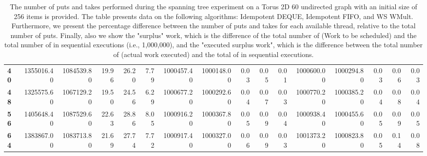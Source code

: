 \begin{table}[!ht]
{\begin{tabular}{lrrrrrrrrrrrrrrr}
\textbf{40} &       1355016.40 & 1084539.80 &          19.96 &       26.20 &                 7.79 &      1000457.40 & 1000148.00 &           0.03 &        0.05 &                 0.01 & 1000600.00 & 1000294.80 &           0.03 &        0.06 &                 0.03 \\
\textbf{48} &       1325575.60 & 1067129.20 &          19.50 &       24.56 &                 6.29 &      1000677.20 & 1000292.60 &           0.04 &        0.07 &                 0.03 & 1000770.20 & 1000385.20 &           0.04 &        0.08 &                 0.04 \\
\textbf{56} &       1405648.40 & 1087529.60 &          22.63 &       28.86 &                 8.05 &      1000916.20 & 1000367.80 &           0.05 &        0.09 &                 0.04 & 1000938.40 & 1000455.60 &           0.05 &        0.09 &                 0.05 \\
\textbf{64} &       1383867.00 & 1083713.80 &          21.69 &       27.74 &                 7.72 &      1000917.40 & 1000327.00 &           0.06 &        0.09 &                 0.03 & 1001373.20 & 1000823.80 &           0.05 &        0.14 &                 0.08 \\
\bottomrule
\end{tabular}}
\label{difference-Torus_2D_60_undirected-256-IDEMPOTENT_DEQUE-IDEMPOTENT_FIFO-WS_NC_MULT_OPT}
\caption{The number of puts and takes performed during the
    spanning tree experiment on a Torus 2D 60 undirected graph with an initial size
    of 256 items is provided. The table presents data on the
    following algorithms: Idempotent DEQUE, Idempotent FIFO, and
    WS WMult. Furthermore, we present the percentage difference
    between the number of puts and takes for each available thread,
    relative to the total number of puts. Finally, also we show the
    "surplus" work, which is the difference of the total number of
    \Puts (Work to be scheduled) and the total number of \Puts in
    sequential executions (i.e., 1,000,000), and the "executed surplus
    work", which is the difference between the total number of \Takes
    (actual work executed) and the total of \Takes in sequential
    executions.}
\end{table}

